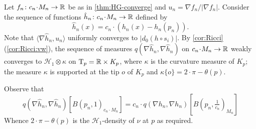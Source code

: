 Let $f_n\:c_n\cdot M_n\to \RR$ be as in \ref{thm:HG-converge} and $u_n=\nabla f_n/|\nabla f_n|$.
Consider the sequence of functions $\hat h_n\:c_n\cdot M_n\to \RR$ defined by 
\[\hat h_n(x)=c_n\cdot(h_n(x)-h_n(p_n)).\]
Note that $\langle\nabla \hat h_n,u_n\rangle$ uniformly converges to  $|d_0(h\circ s_i)|$.
By \ref{cor:Ricci}(\ref{cor:Ricci:vw}), the sequence of measures $q(\nabla\hat h_n, \nabla\hat h_n)$ on $c_n\cdot M_n\to \RR$ weakly converges to $\mathcal{H}_1\otimes\kappa $ on $\T_p\zz=\RR\times K_p$, 
where $\kappa$ is the curvature measure of $K_p$; 
the measure $\kappa$ is supported at the tip $o$ of $K_p$
and $\kappa\{o\}=2\cdot \pi-\theta(p)$.

Observe that 
\[q(\nabla\hat h_n, \nabla\hat h_n)[B(p_n,1)_{c_n\cdot M_n}]
=
c_n\cdot q(\nabla h_n, \nabla h_n)[B(p_n,\tfrac1{c_n})_{M_n}]\]
Whence $2\cdot \pi-\theta(p)$ is the $\mathcal{H}_1$-density of $\nu$ at $p$ as required.
\qeds
